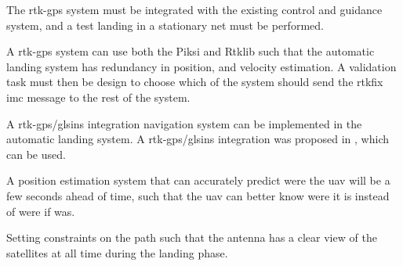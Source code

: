 The \gls{rtk-gps} system must be integrated with the existing control and guidance system, and a test landing in a stationary net must be performed. 

A \gls{rtk-gps} system can use both the Piksi and Rtklib such that the automatic landing system has redundancy in position, and velocity estimation. A validation task must then be design to choose which of the system should send the rtkfix \gls{imc} message to the rest of the system.

A \gls{rtk-gps}/gls{ins} integration navigation system can be implemented in the automatic landing system. A \gls{rtk-gps}/gls{ins} integration was proposed in \citep{Spockeli}, which can be used.

A position estimation system that can accurately predict were the \gls{uav} will be a few seconds ahead of time, such that the \gls{uav} can better know were it is instead of were if was.

Setting constraints on the path such that the antenna has a clear view of the satellites at all time during the landing phase. 
\cleardoublepage